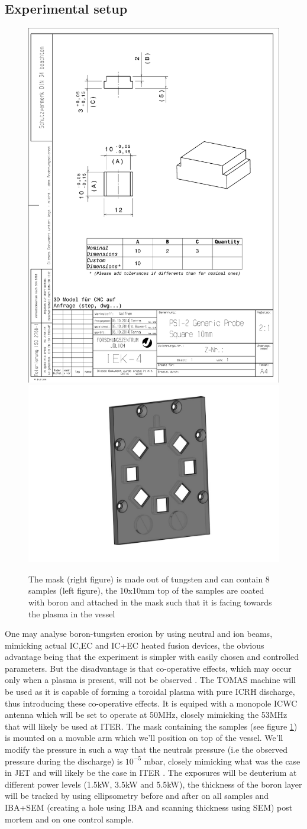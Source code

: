 \documentclass{article}
\begin{document}
\subsection{Experimental setup}
\begin{figure}[ht]
    \centering
    \includegraphics[height=0.33\textwidth]{figures/Sample.pdf}
    \includegraphics[height=0.33\textwidth]{figures/mask.pdf}
    \caption{The mask (right figure) is made out of tungsten and can contain 8 samples (left figure), 
    the 10x10mm top of the samples are coated with boron and attached in the mask such that it is facing towards    the plasma in the vessel}
    \label{fig:samples+mask}
\end{figure}
One may analyse boron-tungsten erosion by using neutral and ion beams,
mimicking actual IC,EC and IC+EC heated fusion devices, the obvious 
advantage being that the experiment is simpler with
easily chosen and controlled parameters.  But the disadvantage is that co-operative effects,
which may occur only when a plasma is present, will not be observed
\cite{McCRACKEN}. The TOMAS machine \cite{TOMAS} will be used as it is capable
of forming a toroidal plasma with pure ICRH discharge, thus introducing these
co-operative effects.  It is equiped with a monopole ICWC antenna which will be
set to operate at 50MHz, closely mimicking the 53MHz that will likely be used
at ITER.  The mask containing the samples (see figure \ref{fig:samples+mask})
is mounted on a movable arm which we'll position on top of the vessel.  
We'll modify the pressure in such a way that the
neutrals pressure (i.e the observed pressure during the discharge) is $10^{-5}$
mbar, closely mimicking what was the case in JET and will likely be the case in
ITER \cite{DOUAI}.
The exposures will be deuterium at different power levels (1.5kW, 3.5kW and
5.5kW), the thickness of the boron layer will be tracked by using ellipsometry
before and after on all samples and IBA+SEM (creating a hole using IBA and
scanning thickness using SEM) post mortem and on one control sample.
\end{document}
